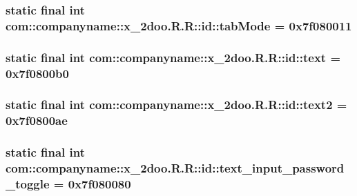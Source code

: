 \hypertarget{classcom_1_1companyname_1_1x__2doo_1_1_r_1_1id_bac19da010e7b3615f63a851241e2787}{
\subsubsection[{tabMode}]{\setlength{\rightskip}{0pt plus 5cm}static final int com::companyname::x\_\-2doo.R.R::id::tabMode = 0x7f080011}}
\label{classcom_1_1companyname_1_1x__2doo_1_1_r_1_1id_bac19da010e7b3615f63a851241e2787}


\hypertarget{classcom_1_1companyname_1_1x__2doo_1_1_r_1_1id_cabc2ef1305920f5b11f6b1c55d2e3a5}{
\subsubsection[{text}]{\setlength{\rightskip}{0pt plus 5cm}static final int com::companyname::x\_\-2doo.R.R::id::text = 0x7f0800b0}}
\label{classcom_1_1companyname_1_1x__2doo_1_1_r_1_1id_cabc2ef1305920f5b11f6b1c55d2e3a5}


\hypertarget{classcom_1_1companyname_1_1x__2doo_1_1_r_1_1id_9cd46c3a0d63ef33c5b2ef96a44998e8}{
\subsubsection[{text2}]{\setlength{\rightskip}{0pt plus 5cm}static final int com::companyname::x\_\-2doo.R.R::id::text2 = 0x7f0800ae}}
\label{classcom_1_1companyname_1_1x__2doo_1_1_r_1_1id_9cd46c3a0d63ef33c5b2ef96a44998e8}


\hypertarget{classcom_1_1companyname_1_1x__2doo_1_1_r_1_1id_8dec2023f57abb12e2a24f7f54d3fe3a}{
\subsubsection[{text\_\-input\_\-password\_\-toggle}]{\setlength{\rightskip}{0pt plus 5cm}static final int com::companyname::x\_\-2doo.R.R::id::text\_\-input\_\-password\_\-toggle = 0x7f080080}}
\label{classcom_1_1companyname_1_1x__2doo_1_1_r_1_1id_8dec2023f57abb12e2a24f7f54d3fe3a}


